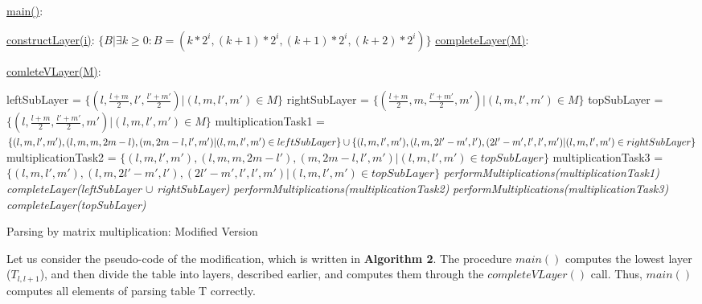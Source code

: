 \documentclass[runningheads]{llncs}
\begin{document}
\begin{algorithm}
\SetAlgoNoLine
{}
\underline{main()}{:}{
 
 \BlankLine
 }
 
\underline{constructLayer(i)}{:}{
 \BlankLine
 $\{B | \exists k \geq 0 : B = (k*2^i, (k+1)*2^i, (k + 1)*2^i, (k+2)*2^i) \}$
 \BlankLine
    }
\underline{completeLayer(M)}{:}{
\BlankLine
{}
\BlankLine
}
 
\underline{comleteVLayer(M)}{:}{
 \BlankLine
 leftSubLayer = $\{ (l, \frac{l+m}{2}, l', \frac{l'+m'}{2}) | (l, m, l', m') \in M\}$\;
 rightSubLayer = $\{ (\frac{l+m}{2}, m, \frac{l'+m'}{2}, m') | (l, m, l', m') \in M\}$\;
 topSubLayer = $\{ (l, \frac{l+m}{2}, \frac{l'+m'}{2}, m') | (l, m, l', m') \in M\}$\;
 multiplicationTask1 = $\{(l, m, l', m'), (l, m, m, 2m - l), (m, 2m - l, l', m') | (l, m, l', m') \in leftSubLayer\} \cup \linebreak  \{(l, m, l', m'), (l, m, 2l' - m', l'), (2l' - m', l', l', m') | (l, m, l', m') \in rightSubLayer\}$\;
 \BlankLine
 multiplicationTask2 = $\{(l, m, l', m'), (l, m, m, 2m - l'), (m, 2m - l, l', m') | (l, m, l', m') \in topSubLayer\}$\;
 \BlankLine 
 multiplicationTask3 = $\{(l, m, l', m'), (l, m, 2l' - m', l'), (2l' - m', l', l', m') | (l, m, l', m') \in topSubLayer\}$\;
 \BlankLine
 \textit{performMultiplications(multiplicationTask1)}\;
 \textit{completeLayer(leftSubLayer $\cup$ rightSubLayer)}\;
 \textit{performMultiplications(multiplicationTask2)}\;
 \textit{performMultiplications(multiplicationTask3)}\;
 \textit{completeLayer(topSubLayer)}
 
 }

\caption{Parsing by matrix multiplication: Modified Version}
\end{algorithm}

Let us consider the pseudo-code of the modification, which is written in \textbf{Algorithm 2}. The procedure $main()$ computes the lowest layer ($T_{l, l+1}$), and then divide the table into layers, described earlier, and computes them through the $completeVLayer()$ call. Thus, $main()$ computes all elements of parsing table T correctly.
\end{document}
